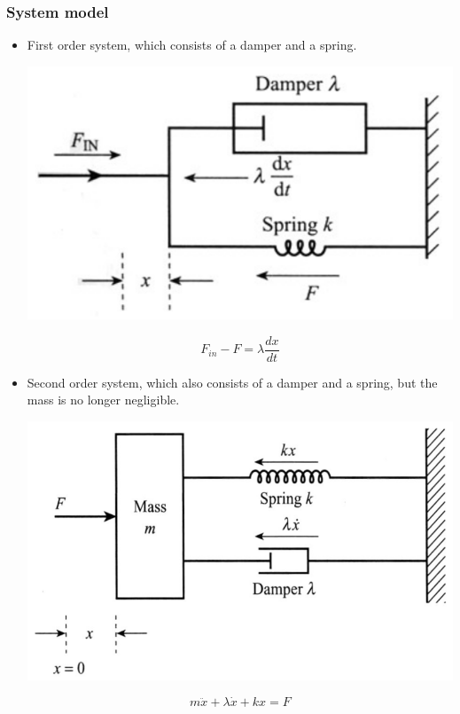 \documentclass[11pt]{article}
\begin{document}
\subsubsection{System model}
\label{sec:org8021c71}
\begin{itemize}
\item First order system, which consists of a damper and a spring.
\begin{center}
\includegraphics[width=.9\linewidth]{./images/first-order-system-diagram.png}
\end{center}
\[F_{in} - F = \lambda \frac{dx}{dt}\]

\item Second order system, which also consists of a damper and a spring, but the mass is no longer negligible.
\begin{center}
\includegraphics[width=.9\linewidth]{./images/second-order-system-diagram.png}
\end{center}
\[m \ddot{x} + \lambda \dot{x} + kx = F\]
\end{itemize}
\end{document}
